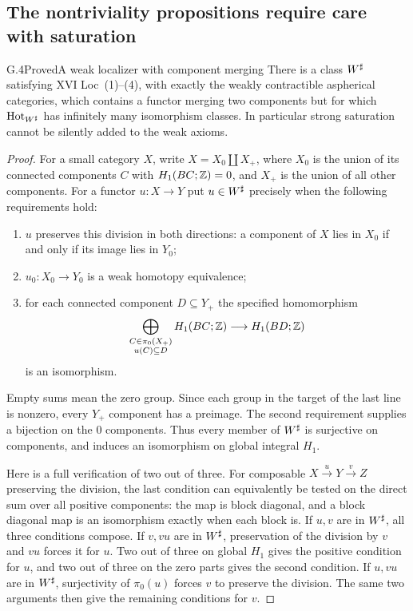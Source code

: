 \subsection{The nontriviality propositions require care with saturation}

\begin{claim}{G.4}{Proved}{A weak localizer with component merging}
\label{G:Wsharp}
There is a class $W^{\sharp}$ satisfying XVI Loc~(1)--(4), with exactly
the weakly contractible aspherical categories, which contains a
functor merging two components but for which $\operatorname{Hot}_{W^{\sharp}}$ has
infinitely many isomorphism classes.  In particular strong saturation
cannot be silently added to the weak axioms.
\end{claim}
\begin{proof}
For a small category $X$, write $X=X_0\amalg X_+$, where $X_0$ is the
union of its connected components $C$ with $H_1(BC;\mathbb Z)=0$, and $X_+$
is the union of all other components.  For a functor $u:X\to Y$ put
$u\in W^{\sharp}$ precisely when the following requirements hold:
\begin{enumerate}
\item $u$ preserves this division in both directions: a component of
$X$ lies in $X_0$ if and only if its image lies in $Y_0$;
\item $u_0:X_0\to Y_0$ is a weak homotopy equivalence;
\item for each connected component $D\subseteq Y_+$ the specified
homomorphism
\[
 \bigoplus_{\substack{C\in\pi_0(X_+)\\u(C)\subseteq D}}
 H_1(BC;\mathbb Z)\longrightarrow H_1(BD;\mathbb Z)
\]
is an isomorphism.
\end{enumerate}
Empty sums mean the zero group.  Since each group in the target of
the last line is nonzero, every $Y_+$ component has a preimage.
The second requirement supplies a bijection on the $0$ components.
Thus every member of $W^{\sharp}$ is surjective on components, and
induces an isomorphism on global integral $H_1$.

Here is a full verification of two out of three.  For composable
$X\xrightarrow{u}Y\xrightarrow{v}Z$ preserving the division,
the last condition can equivalently be tested on the direct sum over
all positive components: the map is block diagonal, and a block
diagonal map is an isomorphism exactly when each block is.  If $u,v$
are in $W^{\sharp}$, all three conditions compose.  If $v,vu$ are in
$W^{\sharp}$, preservation of the division by $v$ and $vu$ forces it
for $u$.  Two out of three on global $H_1$ gives the positive condition
for $u$, and two out of three on the zero parts gives the second
condition.  If $u,vu$ are in $W^{\sharp}$, surjectivity of $\pi_0(u)$
forces $v$ to preserve the division.  The same two arguments then
give the remaining conditions for $v$.


\end{proof}
